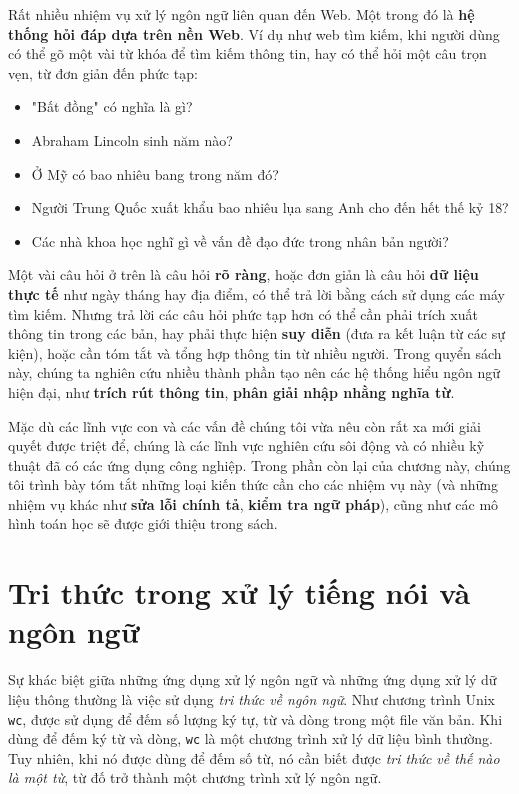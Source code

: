 Rất nhiều nhiệm vụ xử lý ngôn ngữ liên quan đến Web. Một trong đó là \textbf{hệ thống hỏi đáp dựa trên nền Web}. Ví dụ như web tìm kiếm, khi người dùng có thể gõ một vài từ khóa để tìm kiếm thông tin, hay có thể hỏi một câu trọn vẹn, từ đơn giản đến phức tạp:

\begin{itemize}[noitemsep]
  \item "Bất đồng" có nghĩa là gì?
  \item Abraham Lincoln sinh năm nào?
  \item Ở Mỹ có bao nhiêu bang trong năm đó?
  \item Người Trung Quốc xuất khẩu bao nhiêu lụa sang Anh cho đến hết thế kỷ 18?
  \item Các nhà khoa học nghĩ gì về vấn đề đạo đức trong nhân bản người?
\end{itemize}

Một vài câu hỏi ở trên là câu hỏi \textbf{rõ ràng}, hoặc đơn giản là câu hỏi \textbf{dữ liệu thực tế} như ngày tháng hay địa điểm, có thể trả lời bằng cách sử dụng các máy tìm kiếm. Nhưng trả lời các câu hỏi phức tạp hơn có thể cần phải trích xuất thông tin trong các bản, hay phải thực hiện \textbf{suy diễn} (đưa ra kết luận từ các sự kiện), hoặc cần tóm tắt và tổng hợp thông tin từ nhiều người. Trong quyển sách này, chúng ta nghiên cứu nhiều thành phần tạo nên các hệ thống hiểu ngôn ngữ hiện đại, như \textbf{trích rút thông tin}, \textbf{phân giải nhập nhằng nghĩa từ}.

Mặc dù các lĩnh vực con và các vấn đề chúng tôi vừa nêu còn rất xa mới giải quyết được triệt để, chúng là các lĩnh vực nghiên cứu sôi động và có nhiều kỹ thuật đã có các ứng dụng công nghiệp. Trong phần còn lại của chương này, chúng tôi trình bày tóm tắt những loại kiến thức cần cho các nhiệm vụ này (và những nhiệm vụ khác như \textbf{sửa lỗi chính tả}, \textbf{kiểm tra ngữ pháp}), cũng như các mô hình toán học sẽ được giới thiệu trong sách.

\section{Tri thức trong xử lý tiếng nói và ngôn ngữ}

Sự khác biệt giữa những ứng dụng xử lý ngôn ngữ và những ứng dụng xử lý dữ liệu thông thường là việc sử dụng \textit{tri thức về ngôn ngữ}. Như chương trình Unix \verb|wc|, được sử dụng để đếm số lượng ký tự, từ và dòng trong một file văn bản. Khi dùng để đếm ký từ và dòng, \verb|wc| là một chương trình xử lý dữ liệu bình thường. Tuy nhiên, khi nó được dùng để đếm số từ, nó cần biết được \textit{tri thức về thế nào là một từ}, từ đố trở thành một chương trình xử lý ngôn ngữ.

